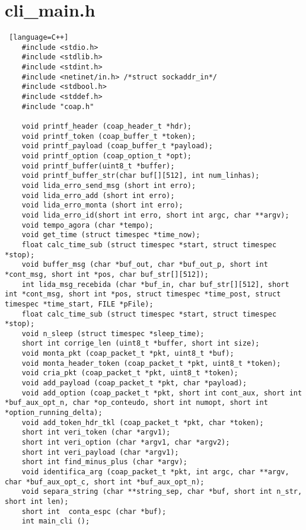\tocless\section{cli\_main.h}

\begin{lstlisting} [language=C++]
	#include <stdio.h>
	#include <stdlib.h>
	#include <stdint.h>
	#include <netinet/in.h> /*struct sockaddr_in*/
	#include <stdbool.h>
	#include <stddef.h>
	#include "coap.h"
	
	void printf_header (coap_header_t *hdr);
	void printf_token (coap_buffer_t *token);
	void printf_payload (coap_buffer_t *payload);
	void printf_option (coap_option_t *opt);
	void printf_buffer(uint8_t *buffer);
	void printf_buffer_str(char buf[][512], int num_linhas);
	void lida_erro_send_msg (short int erro);
	void lida_erro_add (short int erro);
	void lida_erro_monta (short int erro);
	void lida_erro_id(short int erro, short int argc, char **argv);
	void tempo_agora (char *tempo);
	void get_time (struct timespec *time_now);
	float calc_time_sub (struct timespec *start, struct timespec *stop);
	void buffer_msg (char *buf_out, char *buf_out_p, short int *cont_msg, short int *pos, char buf_str[][512]);
	int lida_msg_recebida (char *buf_in, char buf_str[][512], short int *cont_msg, short int *pos, struct timespec *time_post, struct timespec *time_start, FILE *pFile);
	float calc_time_sub (struct timespec *start, struct timespec *stop);
	void n_sleep (struct timespec *sleep_time);
	short int corrige_len (uint8_t *buffer, short int size);
	void monta_pkt (coap_packet_t *pkt, uint8_t *buf);
	void monta_header_token (coap_packet_t *pkt, uint8_t *token);
	void cria_pkt (coap_packet_t *pkt, uint8_t *token);
	void add_payload (coap_packet_t *pkt, char *payload);
	void add_option (coap_packet_t *pkt, short int cont_aux, short int *buf_aux_opt_n, char *op_conteudo, short int numopt, short int *option_running_delta);
	void add_token_hdr_tkl (coap_packet_t *pkt, char *token);
	short int veri_token (char *argv1);
	short int veri_option (char *argv1, char *argv2);
	short int veri_payload (char *argv1);
	short int find_minus_plus (char *argv);
	void identifica_arg (coap_packet_t *pkt, int argc, char **argv, char *buf_aux_opt_c, short int *buf_aux_opt_n);
	void separa_string (char **string_sep, char *buf, short int n_str, short int len);
	short int  conta_espc (char *buf);
	int main_cli ();
\end{lstlisting}
